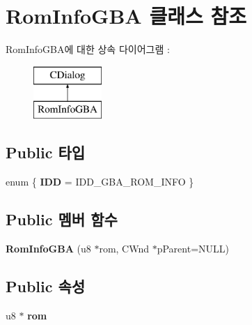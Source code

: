 \hypertarget{class_rom_info_g_b_a}{}\section{Rom\+Info\+G\+BA 클래스 참조}
\label{class_rom_info_g_b_a}
Rom\+Info\+G\+B\+A에 대한 상속 다이어그램 \+: \begin{figure}[H]
\begin{center}
\leavevmode
\includegraphics[height=2.000000cm]{class_rom_info_g_b_a}
\end{center}
\end{figure}
\subsection*{Public 타입}
\begin{DoxyCompactItemize}
\item 
\mbox{\label{class_rom_info_g_b_a_a6425fe061557249d4e064c130d9768f8}} 
enum \{ {\bfseries I\+DD} = I\+D\+D\+\_\+\+G\+B\+A\+\_\+\+R\+O\+M\+\_\+\+I\+N\+FO
 \}
\end{DoxyCompactItemize}
\subsection*{Public 멤버 함수}
\begin{DoxyCompactItemize}
\item 
\mbox{\label{class_rom_info_g_b_a_a60647da88fd06c7e804844aa1836415c}} 
{\bfseries Rom\+Info\+G\+BA} (u8 $\ast$rom, C\+Wnd $\ast$p\+Parent=N\+U\+LL)
\end{DoxyCompactItemize}
\subsection*{Public 속성}
\begin{DoxyCompactItemize}
\item 
\mbox{\label{class_rom_info_g_b_a_af44895da29e3b91d95cd31f3acb0eb60}} 
u8 $\ast$ {\bfseries rom}
\end{DoxyCompactItemize}
